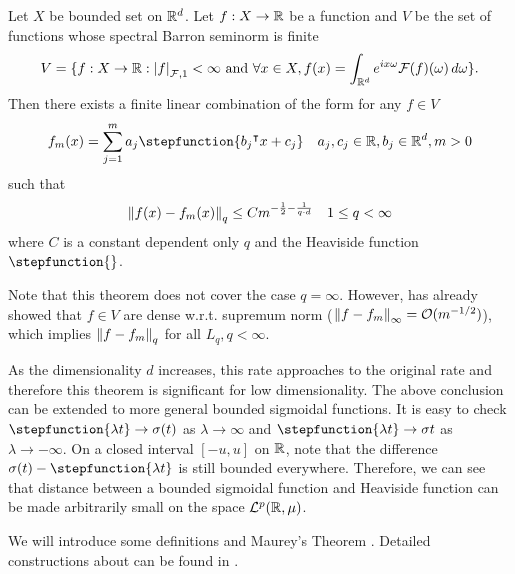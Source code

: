 \begin{theorem}\cite[Theorem 3]{makovozRandomApproximantsNeural1996}
    \label{thm:improve_barron}
    
    Let $X$ be bounded set on $\mathbb{R}^d$. Let $f: X \to \mathbb{R}$ be a function and $V$ be
    the set of functions whose spectral Barron seminorm is finite
    \begin{equation}
        V =\{f: X\to\mathbb{R} : \left| f \right|_{\mathcal{F}, {1}} < \infty \text{ and } \forall x\in X,
        f(x) = \int_{\mathbb{R}^d} e^{ix\omega}\mathcal{F}(f)(\omega)\,d\omega\}.
    \end{equation}
    Then there exists a finite linear combination of the form for any $f \in V$
    \begin{equation}
        f_m(x) = \sum_{j=1}^m a_j \stepfunction{b_j\tr x + c_j} \quad 
            a_j, c_j \in \R, b_j \in \R^d, m > 0
    \end{equation}
    such that 
    \begin{equation}
        \left\| f(x) - f_m(x) \right\|_{q} \leq C m^{-\frac{1}{2} - \frac{1}{q \cdot d}}
        \quad 1 \leq q < \infty
    \end{equation}
    where $C$ is a constant dependent only $q$ and the Heaviside function
    $\stepfunction{}$.
\end{theorem}


Note that this theorem does not cover the case $q = \infty$. However,
\cite{barronUniversalApproximationBounds1993} has already showed that $f\in V$ are
dense w.r.t. supremum norm ($\left\| f - f_m \right\|_{\infty} = \mathcal{O}(m^{-1/2})$), which
implies $\left\| f-f_m \right\|_{q}$ for all $L_q, q<\infty$.

As the dimensionality $d$ increases, this rate approaches to the original rate
and therefore this theorem is significant for low dimensionality. The above
conclusion can be extended to more general bounded sigmoidal functions. It is
easy to check $\stepfunction{\lambda t} \to \sigma(t)$ as $\lambda \to \infty$
and $\stepfunction{\lambda t} \to \sigma{t}$ as $\lambda \to -\infty$. On a
closed interval $[-u, u]$ on $\mathbb{R}$, note that the difference $\sigma(t) -
\stepfunction{\lambda t}$ is still bounded everywhere. Therefore, we can see
that distance between a bounded sigmoidal function and Heaviside function can be
made arbitrarily small on the space $\mathcal{L}^{p}(\mathbb{R}, \mu)$.

We will introduce some definitions and Maurey's Theorem
\cite{pisierRemarquesResultatNon1980}. Detailed constructions about can be found
in \cite{vandervaartWeakConvergenceEmpirical1996}.


